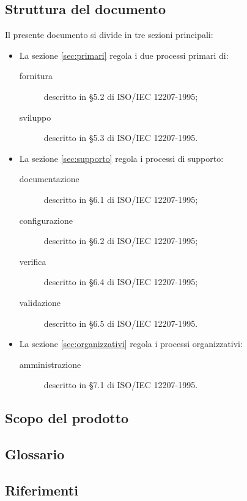 \subsection{Struttura del documento}
Il presente documento si divide in tre sezioni principali:
\begin{itemize}
	\item La sezione \ref{sec:primari} regola i due processi primari di:
	\begin{description}
		\item[fornitura] descritto in §5.2 di ISO/IEC 12207-1995;
		\item[sviluppo] descritto in §5.3 di ISO/IEC 12207-1995.
	\end{description}
	\item La sezione \ref{sec:supporto} regola i processi di supporto:
	\begin{description}
		\item[documentazione] descritto in §6.1 di ISO/IEC 12207-1995;
		\item[configurazione] descritto in §6.2 di ISO/IEC 12207-1995;
		\item[verifica] descritto in §6.4 di ISO/IEC 12207-1995;
		\item[validazione] descritto in §6.5 di ISO/IEC 12207-1995.
	\end{description}
	\item La sezione \ref{sec:organizzativi} regola i processi organizzativi:
	\begin{description}
		\item[amministrazione] descritto in §7.1 di ISO/IEC 12207-1995.
	\end{description}
\end{itemize}

\subsection{Scopo del prodotto}
\scopo

\subsection{Glossario}
\presgloss

\subsection{Riferimenti} \label{sec:ref}

